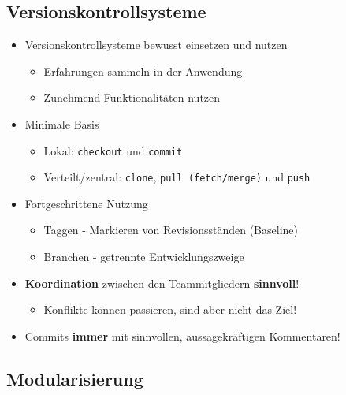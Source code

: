 \documentclass[a4paper]{article}
\begin{document}
		\subsection{Versionskontrollsysteme}
		
			\begin{itemize}
				\item Versionskontrollsysteme bewusst einsetzen und nutzen
					\begin{itemize}
						\item Erfahrungen sammeln in der Anwendung
						\item Zunehmend Funktionalitäten nutzen
					\end{itemize}
				\item Minimale Basis
					\begin{itemize}
						\item Lokal: \texttt{checkout} und \texttt{commit}
						\item Verteilt/zentral: \texttt{clone}, \texttt{pull (fetch/merge)} und \texttt{push}
					\end{itemize}
				\item Fortgeschrittene Nutzung
					\begin{itemize}
						\item Taggen - Markieren von Revisionsständen (Baseline)
						\item Branchen - getrennte Entwicklungszweige
					\end{itemize}
				\item \textbf{Koordination} zwischen den Teammitgliedern \textbf{sinnvoll}!
					\begin{itemize}
						\item Konflikte können passieren, sind aber nicht das Ziel!
					\end{itemize}
				\item Commits \textbf{immer} mit sinnvollen, aussagekräftigen Kommentaren!
			\end{itemize}
		
		\subsection{Modularisierung}
			
\end{document}
